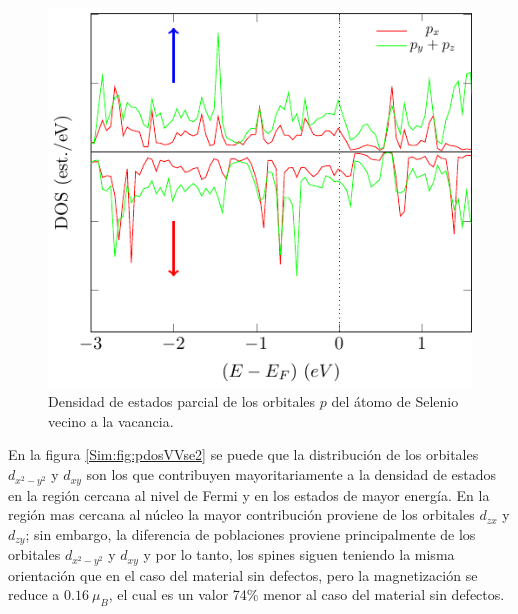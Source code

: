 \begin{figure}[!hbt]
	\centering
	\includegraphics[scale=1]{figRes/VSe2/def/bandas/nosoc/pdosSe_vac.pdf}
	\caption[Densidad de estados parcial de los orbitales $p$ del \'atomo de Selenio vecino a la vacancia en VSe\textsubscript{2} con vacancia de vanadio]{Densidad de estados parcial de los orbitales $p$ del \'atomo de Selenio vecino a la vacancia.}
	\label{Sim:fig:pdosSevacVse2}
\end{figure}
En la figura \ref{Sim:fig:pdosVVse2} se puede  que la distribuci\'on de los orbitales $d_{x^2-y^2}$ y $d_{xy}$ son los que contribuyen mayoritariamente a la densidad de estados en la regi\'on cercana al nivel de Fermi y en los estados de mayor energ\'ia. En la regi\'on mas cercana al n\'ucleo la mayor contribuci\'on proviene de los orbitales $d_{zx}$ y $d_{zy}$; sin embargo, la diferencia de poblaciones proviene principalmente de los orbitales $d_{x^2-y^2}$ y $d_{xy}$ y por lo tanto, los spines siguen teniendo la misma orientaci\'on que en el caso del material sin defectos, pero la magnetizaci\'on se reduce a $0.16~\mu_B$, el cual es un valor 74\% menor al caso del material sin defectos.
